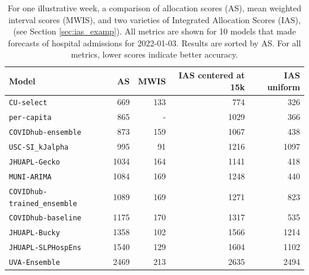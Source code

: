 \documentclass{article}\usepackage[]{graphicx}\usepackage[]{xcolor}
\begin{document}
\begin{table}[ht]
\centering
\begin{tabular}{lrrrr}
  \hline
Model & AS & MWIS & IAS centered at 15k & IAS uniform \\ 
  \hline
\texttt{CU-select} & 669 & 133 & 774 & 326 \\ 
  \texttt{per-capita} & 865 & - & 1029 & 366 \\ 
  \texttt{COVIDhub-ensemble} & 873 & 159 & 1067 & 438 \\ 
  \texttt{USC-SI\_kJalpha} & 995 & 91 & 1216 & 1097 \\ 
  \texttt{JHUAPL-Gecko} & 1034 & 164 & 1141 & 418 \\ 
  \texttt{MUNI-ARIMA} & 1084 & 169 & 1248 & 440 \\ 
  \texttt{COVIDhub-trained\_ensemble} & 1089 & 169 & 1271 & 823 \\ 
  \texttt{COVIDhub-baseline} & 1175 & 170 & 1317 & 535 \\ 
  \texttt{JHUAPL-Bucky} & 1358 & 102 & 1566 & 1214 \\ 
  \texttt{JHUAPL-SLPHospEns} & 1540 & 129 & 1604 & 1102 \\ 
  \texttt{UVA-Ensemble} & 2469 & 213 & 2635 & 2494 \\ 
   \hline
\end{tabular}
\caption{For one illustrative week, a comparison of allocation scores (AS), mean weighted interval scores (MWIS), and two varieties of Integrated Allocation Scores (IAS), (see Section \ref{sec:ias_examp}). All metrics are shown for 10 models that made forecasts of hospital admissions for 2022-01-03. Results are sorted by AS. For all metrics, lower scores indicate better accuracy.} 
\label{tab:multi-k-scores}
\end{table}
\end{document}
